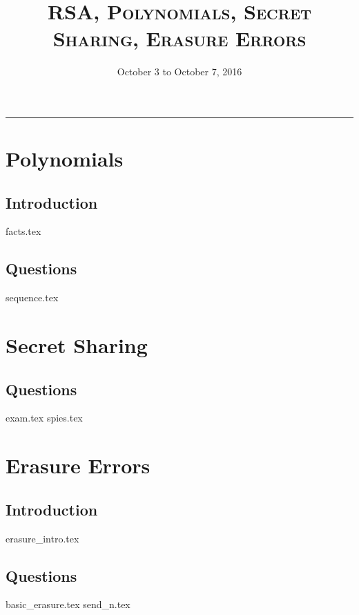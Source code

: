 \documentclass{exam}
\title{\textsc{RSA, Polynomials, Secret Sharing, Erasure Errors }}
\date{October 3 to October 7, 2016}
\begin{document}
\maketitle
\rule{\textwidth}{0.15em}
\fontsize{12}{15}\selectfont
\thispagestyle{empty}

\section{Polynomials}
\subsection{Introduction}
{facts.tex}
\subsection{Questions}
\begin{questions}
{sequence.tex}
\end{questions}

\section{Secret Sharing}
\subsection{Questions}
\begin{questions}
	{exam.tex}
	{spies.tex}
\end{questions}

\section{Erasure Errors}
\subsection{Introduction}
{erasure_intro.tex}
\subsection{Questions}
\begin{questions}
{basic_erasure.tex}
{send_n.tex}
\end{questions}
\end{document}
